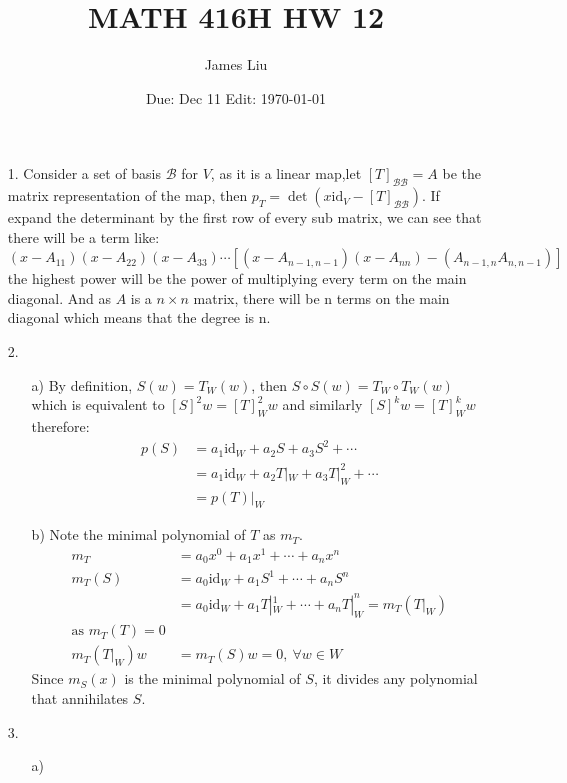 \documentclass{article}
\date{Due: Dec 11 Edit: \today}
\title{MATH 416H HW 12}
\author{James Liu}
\begin{document}
\maketitle
\begin{itemize}
    \item [1.] Consider a set of basis \(\mathcal{ B}\) for \(V\), as it is a linear map,let \([T]_{\mathcal{BB}}=A\) be the matrix
    representation of the map, then \(p_{T}=\det(x\text{id}_V-[T]_{\mathcal{BB}})\). If expand the determinant by the first row of every sub matrix, we can see that there will be 
    a term like:\\ \((x-A_{11})(x-A_{22})(x-A_{33})\cdots\left[(x-A_{n-1,n-1})(x-A_{nn})-(A_{n-1,n}A_{n,n-1})\right]\) the highest power will be the power of multiplying every term on the main diagonal.
    And as \(A\) is a \(n\times n\) matrix, there will be n terms on the main diagonal which means that the degree is n.
    \item [2.]
    \begin{itemize}
        \item [a)] By definition, \(S(w)=T_W(w)\), then \(S\circ S(w)=T_W\circ T_W(w)\) which is equivalent to \([S]^2w=[T]_W^2w\) and
        similarly \([S]^kw=[T]_W^kw\) therefore:
        \begin{align*}
            p(S)&=a_1\text{id}_W+a_2S+a_3S^2+\cdots\\
            &=a_1\text{id}_W+a_2T|_W+a_3T|_W^2+\cdots\\
            &=p(T)|_W
        \end{align*}
        \item [b)] Note the minimal polynomial of \(T\) as \(m_T\).
        \begin{align*}
            m_T&=a_0x^0+a_1x^1+\cdots+a_nx^n\\
            m_T(S)&=a_0\text{id}_W+a_1S^1+\cdots+a_nS^n\\
            &=a_0\text{id}_W+a_1T|_W^1+\cdots+a_nT|_W^n=m_T(T|_W)\\
            \text{as } m_T(T)=0\\
            m_T(T|_W)w&=m_T(S)w=0, \ \forall w\in W
        \end{align*}
        Since \(m_{S}(x)\) is the minimal polynomial of \(S\), it divides any polynomial that annihilates \(S\).
    \end{itemize}
    \item [3.]
    \begin{itemize}
        \item [a)]

\end{itemize}
\end{itemize}
\end{document}
